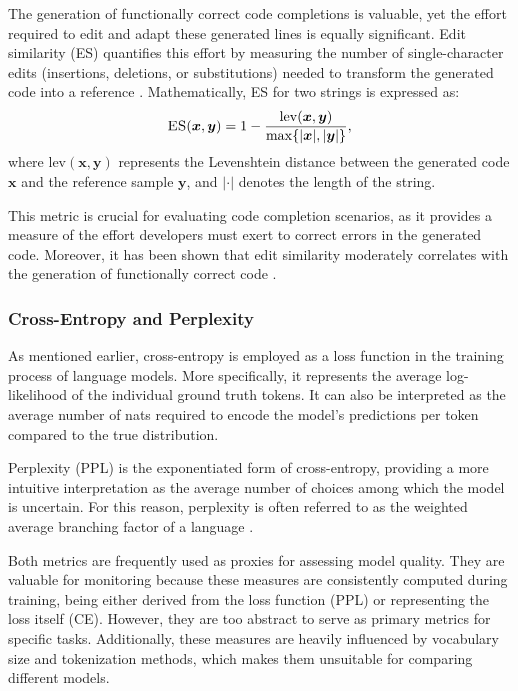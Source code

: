 The generation of functionally correct code completions is valuable, yet the effort required to edit and adapt these generated lines is equally significant. Edit similarity (ES) quantifies this effort by measuring the number of single-character edits (insertions, deletions, or substitutions) needed to transform the generated code into a reference \parencite{svyatkovskiy2020}. Mathematically, ES for two strings is expressed as:
\begin{equation}
    \text{\textsc{ES}}(\bm{x}, \bm{y}) = 1 - \frac{\mathrm{lev}(\bm{x}, \bm{y})}{\max\{|\bm{x}|, |\bm{y}|\}},
\end{equation}
where \(\mathrm{lev}(\bm{x}, \bm{y})\) represents the Levenshtein distance between the generated code \(\bm{x}\) and the reference sample \(\bm{y}\), and \(|\cdot|\) denotes the length of the string.

This metric is crucial for evaluating code completion scenarios, as it provides a measure of the effort developers must exert to correct errors in the generated code. Moreover, it has been shown that edit similarity moderately correlates with the generation of functionally correct code \parencite{dibia2022}.

\subsubsection*{Cross-Entropy and Perplexity}

As mentioned earlier, cross-entropy is employed as a loss function in the training process of language models. More specifically, it represents the average log-likelihood of the individual ground truth tokens. It can also be interpreted as the average number of nats required to encode the model's predictions per token compared to the true distribution.

Perplexity (PPL) is the exponentiated form of cross-entropy, providing a more intuitive interpretation as the average number of choices among which the model is uncertain. For this reason, perplexity is often referred to as the weighted average branching factor of a language \parencite{murphy2022}.

Both metrics are frequently used as proxies for assessing model quality. They are valuable for monitoring because these measures are consistently computed during training, being either derived from the loss function (PPL) or representing the loss itself (CE). However, they are too abstract to serve as primary metrics for specific tasks. Additionally, these measures are heavily influenced by vocabulary size and tokenization methods, which makes them unsuitable for comparing different models.

